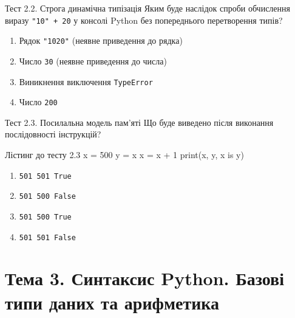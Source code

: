 \begin{pr}{Тест 2.2. Строга динамічна типізація}
Яким буде наслідок спроби обчислення виразу \texttt{"10" + 20} у консолі Python без попереднього перетворення типів?
\begin{enumerate}[label=\textbf{\Alph*.}]
	\item Рядок \texttt{"1020"} (неявне приведення до рядка)
	\item Число \texttt{30} (неявне приведення до числа)
	\item Виникнення виключення \texttt{TypeError}
	\item Число \texttt{200}
\end{enumerate}
\end{pr}

\begin{pr}{Тест 2.3. Посилальна модель пам'яті}
Що буде виведено після виконання послідовності інструкцій?
\begin{py}{Лістинг до тесту 2.3}
x = 500
y = x
x = x + 1
print(x, y, x is y)
\end{py}
\begin{enumerate}[label=\textbf{\Alph*.}]
	\item \texttt{501 501 True}
	\item \texttt{501 500 False}
	\item \texttt{501 500 True}
	\item \texttt{501 501 False}
\end{enumerate}
\end{pr}

\section{Тема 3. Синтаксис Python. Базові типи даних та арифметика}

